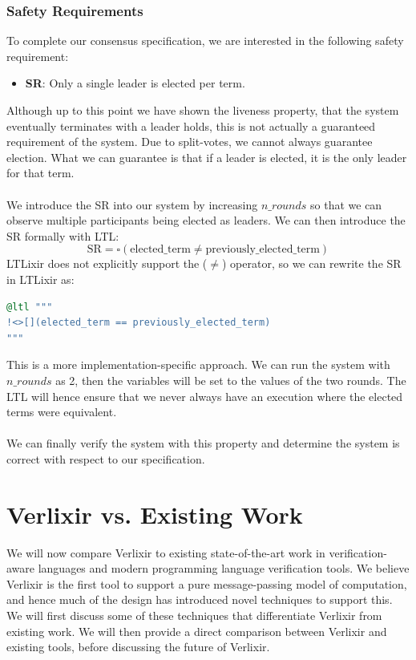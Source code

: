 \subsubsection{Safety Requirements}
To complete our consensus specification, we are interested in the following safety requirement:
\begin{itemize}
    \item \textbf{SR}: Only a single leader is elected per term.
\end{itemize}
Although up to this point we have shown the liveness property, that the system eventually terminates with a leader holds, this is not actually a guaranteed requirement of the system. Due to split-votes, we cannot always guarantee election. What we can guarantee is that if a leader is elected, it is the only leader for that term.
\\ \\
We introduce the SR into our system by increasing $n\_rounds$ so that we can observe multiple participants being elected as leaders. We can then introduce the SR formally with LTL:
\[
\text{SR} = \square ( \text{elected\_term} \neq \text{previously\_elected\_term} )
\]
LTLixir does not explicitly support the ($\neq$) operator, so we can rewrite the SR in LTLixir as:
\begin{lstlisting}[language=Elixir, xleftmargin=.3\linewidth]
@ltl """
!<>[](elected_term == previously_elected_term)
"""
\end{lstlisting}
This is a more implementation-specific approach. We can run the system with $n\_rounds$ as 2, then the variables will be set to the values of the two rounds. The LTL will hence ensure that we never always have an execution where the elected terms were equivalent.
\\ \\
We can finally verify the system with this property and determine the system is correct with respect to our specification.
\section{Verlixir vs. Existing Work} \label{sec:vs}
We will now compare Verlixir to existing state-of-the-art work in verification-aware languages and modern programming language verification tools. We believe Verlixir is the first tool to support a pure message-passing model of computation, and hence much of the design has introduced novel techniques to support this. We will first discuss some of these techniques that differentiate Verlixir from existing work. We will then provide a direct comparison between Verlixir and existing tools, before discussing the future of Verlixir.
